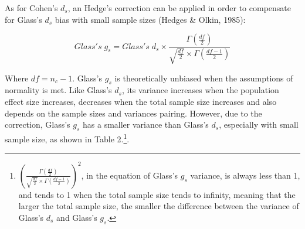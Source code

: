 \documentclass[
  man,floatsintext]{apa6}
\begin{document}
As for Cohen's \(d_s\), an Hedge's correction can be applied in order to compensate for Glass's \(d_s\) bias with small sample sizes (Hedges \& Olkin, 1985):

\begin{equation} 
Glass's \; g_s = Glass's \; d_s \times \frac{\Gamma(\frac{df}{2})}{\sqrt{\frac{df}{2}} \times \Gamma(\frac{df-1}{2})}
\label{eq:Hedgesgs}
\end{equation}

Where \(df=n_c-1\). Glass's \(g_s\) is theoretically unbiased when the assumptions of normality is met. Like Glass's \(d_s\), its variance increases when the population effect size increases, decreases when the total sample size increases and also depends on the sample sizes and variances pairing. However, due to the correction, Glass's \(g_s\) has a smaller variance than Glass's \(d_s\), especially with small sample size, as shown in Table 2.\footnote{$\left(\frac{\Gamma(\frac{df}{2})}{\sqrt{\frac{df}{2}} \times \Gamma(\frac{df-1}{2})} \right)^2$, in the equation of Glass's $g_s$ variance, is always less than 1, and tends to 1 when the total sample size tends to infinity, meaning that the larger the total sample size, the smaller the difference between the variance of Glass's $d_s$ and Glass's $g_s$.}.
\end{document}
